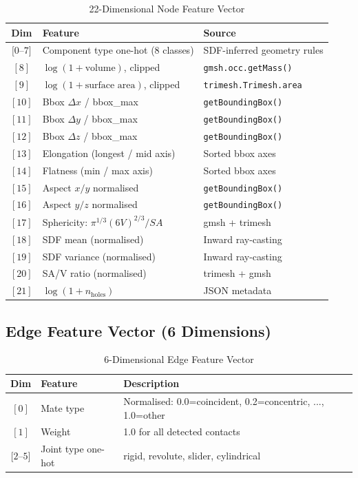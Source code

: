 \documentclass[12pt]{report}
\begin{document}
\begin{table}[H]
\centering
\caption{22-Dimensional Node Feature Vector}
\begin{tabular}{c l l}
\toprule
\textbf{Dim} & \textbf{Feature} & \textbf{Source} \\
\midrule
$[0$--$7]$ & Component type one-hot (8 classes) & SDF-inferred geometry rules \\
$[8]$ & $\log(1 + \text{volume})$, clipped & \texttt{gmsh.occ.getMass()} \\
$[9]$ & $\log(1 + \text{surface area})$, clipped & \texttt{trimesh.Trimesh.area} \\
$[10]$ & Bbox $\Delta x$ / bbox\_max & \texttt{getBoundingBox()} \\
$[11]$ & Bbox $\Delta y$ / bbox\_max & \texttt{getBoundingBox()} \\
$[12]$ & Bbox $\Delta z$ / bbox\_max & \texttt{getBoundingBox()} \\
$[13]$ & Elongation (longest / mid axis) & Sorted bbox axes \\
$[14]$ & Flatness (min / max axis) & Sorted bbox axes \\
$[15]$ & Aspect $x/y$ normalised & \texttt{getBoundingBox()} \\
$[16]$ & Aspect $y/z$ normalised & \texttt{getBoundingBox()} \\
$[17]$ & Sphericity: $\pi^{1/3}(6V)^{2/3} / SA$ & gmsh + trimesh \\
$[18]$ & SDF mean (normalised) & Inward ray-casting \\
$[19]$ & SDF variance (normalised) & Inward ray-casting \\
$[20]$ & SA/V ratio (normalised) & trimesh + gmsh \\
$[21]$ & $\log(1 + n_{\text{holes}})$ & JSON metadata \\
\bottomrule
\end{tabular}
\end{table}

\subsection{Edge Feature Vector (6 Dimensions)}

\begin{table}[H]
\centering
\caption{6-Dimensional Edge Feature Vector}
\begin{tabular}{c l l}
\toprule
\textbf{Dim} & \textbf{Feature} & \textbf{Description} \\
\midrule
$[0]$ & Mate type & Normalised: 0.0=coincident, 0.2=concentric, ..., 1.0=other \\
$[1]$ & Weight & 1.0 for all detected contacts \\
$[2$--$5]$ & Joint type one-hot & rigid, revolute, slider, cylindrical \\
\bottomrule
\end{tabular}
\end{table}
\end{document}
